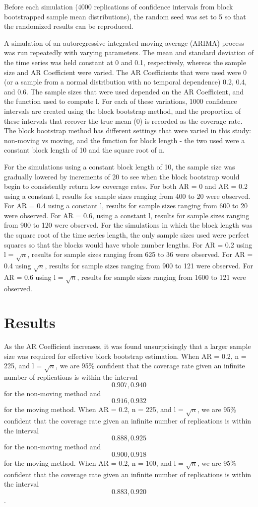 \documentclass[12pt, letterpaper, titlepage]{article}
\begin{document}
Before each simulation (4000 replications of confidence intervals from block bootstrapped sample mean distributions), the random seed was set to 5 so that the randomized results can be 
reproduced. 

A simulation of an autoregressive integrated moving average (ARIMA) process was run 
repeatedly with varying parameters. 
The mean and standard deviation of the time series was held constant at 0 and 0.1, respectively, whereas 
the sample size and AR Coefficient
 were varied. The AR Coefficients that were used were 0 (or a sample from a normal distribution with no temporal dependence) 0.2, 0.4, and 0.6. The sample sizes 
 that were used depended on the AR
 Coefficient, and the function used to compute l. For each of these variations, 1000 
 confidence intervals are created using
 the block bootstrap method, and the proportion of these intervals that recover the true 
 mean (0) is recorded as the coverage
 rate. The block bootstrap method has different settings that were varied in this study: 
 non-moving vs moving, 
and the function for block length - the two used were a constant block length of 10 and 
the square root of n.

For the simulations using a constant block length of 10, the sample size was gradually 
lowered by increments of 20 to see when
the block bootstrap would begin to consistently return low coverage rates. For both AR = 0 and AR = 0.2 
using a constant l, results for
sample sizes ranging from 400 to 20 were observed. For AR = 0.4 using a constant l, 
results for sample sizes ranging from 600
to 20 were observed. For AR = 0.6, using a constant l, results for sample sizes ranging 
from 900 to 120 were observed. For the simulations in which the block length was the 
square root of the time series length, the only sample sizes used were perfect squares so 
that the blocks would have whole number lengths. For AR = 0.2 using l = $\sqrt{n}$, results 
for sample sizes ranging from 625 to 36 were observed. For AR = 0.4 using $\sqrt{n}$, results 
for sample sizes ranging from 900 to 121 were observed. For AR = 0.6 using l = $\sqrt{n}$, 
results for sample sizes ranging from 1600 to 121 were observed. 

\section{Results}
\label{sec:results}

As the AR Coefficient increases, it was found unsurprisingly that a larger sample size was 
required for effective block bootstrap estimation. When AR = 0.2, n = 225, and l = $\sqrt{n}$, we are 95\% confident that the coverage rate given an infinite number of replications is within the interval \[0.907, 0.940\] for the non-moving method and \[0.916, 0.932\] for the moving method. When AR = 0.2, n = 225, and l = $\sqrt{n}$, we are 95\% confident that the coverage rate given an infinite number of replications is within the interval \[0.888, 0.925\] for the non-moving method and \[0.900, 0.918\] for the moving method. When AR = 0.2, n = 100, and l = $\sqrt{n}$, we are 95\% confident that the coverage rate given an infinite number of replications is within the interval \[0.883, 0.920\].
\end{document}
